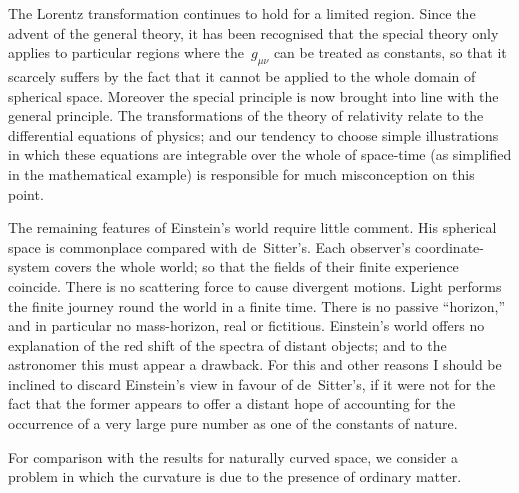 \documentclass[12pt]{book}
\begin{document}
The Lorentz transformation continues to hold for a limited region. Since
the advent of the general theory, it has been recognised that the special theory
only applies to particular regions where the~$g_{\mu\nu}$ can be treated as constants, so
that it scarcely suffers by the fact that it cannot be applied to the whole
domain of spherical space. Moreover the special principle is now brought into
line with the general principle. The transformations of the theory of relativity
relate to the differential equations of physics; and our tendency to choose
simple illustrations in which these equations are integrable over the whole of
space-time (as simplified in the mathematical example) is responsible for much
misconception on this point.

The remaining features of Einstein's world require little comment. His
spherical space is commonplace compared with de~Sitter's. Each observer's
coordinate\hyp{}system covers the whole world; so that the fields of their finite
experience coincide. There is no scattering force to cause divergent motions.
Light performs the finite journey round the world in a finite time. There is
no passive ``horizon,'' and in particular no mass\hyp{}horizon, real or fictitious.
Einstein's world offers no explanation of the red shift of the spectra of distant
objects; and to the astronomer this must appear a drawback. For this and
other reasons I should be inclined to discard Einstein's view in favour of
de~Sitter's, if it were not for the fact that the former appears to offer a distant
hope of accounting for the occurrence of a very large pure number as one of
the constants of nature.

%
%
%

For comparison with the results for naturally curved space, we consider a
problem in which the curvature is due to the presence of ordinary matter.
\end{document}
